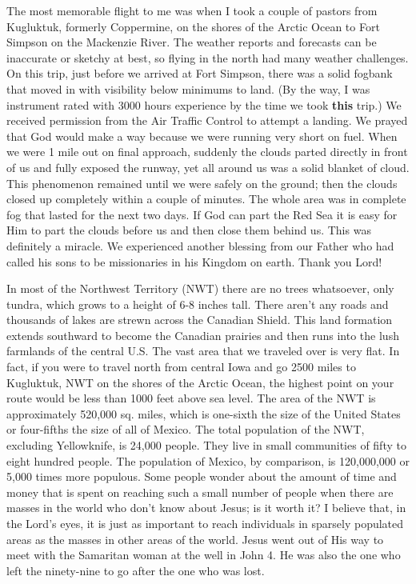 \documentclass[oneside,12pt]{book}
\begin{document}
The most memorable flight to me was when I took a couple of pastors from Kugluktuk, formerly Coppermine, on the shores of the Arctic Ocean to Fort Simpson on the Mackenzie River. The weather reports and forecasts can be inaccurate or sketchy at best, so flying in the north had many weather challenges. On this trip, just before we arrived at Fort Simpson, there was a solid fogbank that moved in with visibility below minimums to land. (By the way, I was instrument rated with 3000 hours experience by the time we took \textbf{this} trip.) We received permission from the Air Traffic Control to attempt a landing. We prayed that God would make a way because we were running very short on fuel. When we were 1 mile out on final approach, suddenly the clouds parted directly in front of us and fully exposed the runway, yet all around us was a solid blanket of cloud. This phenomenon remained until we were safely on the ground; then the clouds closed up completely within a couple of minutes. The whole area was in complete fog that lasted for the next two days. If God can part the Red Sea it is easy for Him to part the clouds before us and then close them behind us. This was definitely a miracle. We experienced another blessing from our Father who had called his sons to be missionaries in his Kingdom on earth. Thank you Lord!

In most of the Northwest Territory (NWT) there are no trees whatsoever, only tundra, which grows to a height of 6-8 inches tall. There aren't any roads and thousands of lakes are strewn across the Canadian Shield. This land formation extends southward to become the Canadian prairies and then runs into the lush farmlands of the central U.S. The vast area that we traveled over is very flat. In fact, if you were to travel north from central Iowa and go 2500 miles to Kugluktuk, NWT on the shores of the Arctic Ocean, the highest point on your route would be less than 1000 feet above sea level. The area of the NWT is approximately 520,000 sq. miles, which is one-sixth the size of the United States or four-fifths the size of all of Mexico. The total population of the NWT, excluding Yellowknife, is 24,000 people. They live in small communities of fifty to eight hundred people. The population of Mexico, by comparison, is 120,000,000 or 5,000 times more populous. Some people wonder about the amount of time and money that is spent on reaching such a small number of people when there are masses in the world who don't know about Jesus; is it worth it? I believe that, in the Lord's eyes, it is just as important to reach individuals in sparsely populated areas as the masses in other areas of the world. Jesus went out of His way to meet with the Samaritan woman at the well in John 4. He was also the one who left the ninety-nine to go after the one who was lost.
\end{document}
